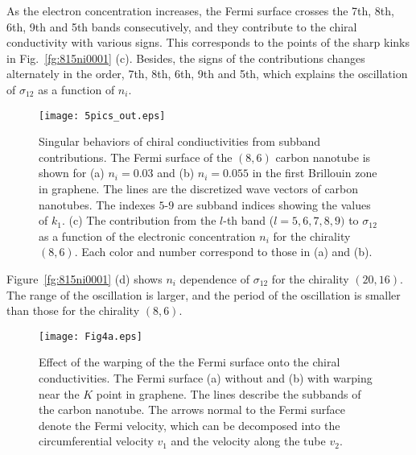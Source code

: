\documentclass[journal=nalefd,manuscript=article,layout=twocolumn]{achemso}
\begin{document}
As the electron concentration increases, the Fermi surface crosses the 
7th, 8th, 6th, 9th and 5th bands consecutively, and they contribute to the 
chiral conductivity with various signs.
This corresponds to the points of the sharp kinks in Fig.\ \ref{fg:815ni0001} (c). 
Besides, the signs of the contributions changes alternately in the order, 7th, 8th, 6th, 9th and 5th, which 
explains the oscillation of $\sigma_{12}$ as a function of $n_i$. 
\begin{figure}[htb]
\texttt{[image: 5pics\_out.eps]}
\caption{Singular behaviors of chiral condiuctivities from subband contributions. The Fermi surface of the $(8,6)$ carbon nanotube is shown 
for (a) $n_i=0.03$ and 
(b) $n_i=0.055$ in the first Brillouin zone in graphene. The lines are the discretized wave vectors 
of carbon nanotubes. The indexes $5$-$9$ are subband indices  showing the values of $k_1$.
(c) The contribution from the $l$-th band ($l=5,6,7,8,9)$ to $\sigma_{12}$ as a function of 
the electronic concentration $n_i$ for the chirality $(8,6)$. 
Each color and number correspond to those in (a) and (b). }
\label{fg:86niband}
\end{figure}
 
Figure\ \ref{fg:815ni0001} (d) shows $n_i$ dependence of $\sigma_{12}$ for the chirality 
$(20,16)$. The range of the oscillation is larger, and the period of the oscillation is smaller 
than those for the chirality $(8,6)$. %
\begin{figure}[htb]
\texttt{[image: Fig4a.eps]}
\caption{Effect of the warping of the the Fermi surface onto the chiral conductivities. The Fermi surface (a) without and (b) with warping near the $K$ point in graphene. 
The lines describe the subbands of the carbon nanotube. 
The arrows normal to the Fermi surface denote the Fermi velocity, which can be 
decomposed into the circumferential velocity $v_1$ and the velocity along the tube $v_2$.} 
\label{fg:image}
\end{figure}
 
\end{document}
